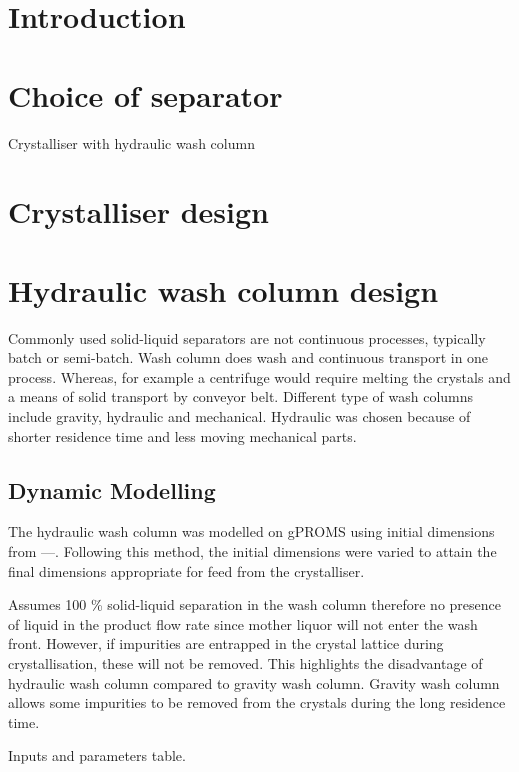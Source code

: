 \section{Introduction}


\section{Choice of separator}
Crystalliser with hydraulic wash column 



\section{Crystalliser design}




\section{Hydraulic wash column design}

Commonly used solid-liquid separators are not continuous processes, typically batch or semi-batch. Wash column does wash and continuous transport in one process. Whereas, for example a centrifuge would require  melting the crystals and a means of solid transport by conveyor belt. Different type of wash columns include gravity, hydraulic and mechanical. Hydraulic was chosen because of shorter residence time and less moving mechanical parts. 

\subsection{Dynamic Modelling}
The hydraulic wash column was modelled on gPROMS using initial dimensions from ---. Following this method, the initial dimensions were varied to attain the final dimensions appropriate for feed from the crystalliser. 

Assumes 100 \% solid-liquid separation in the wash column therefore no presence of liquid in the product flow rate since mother liquor will not enter the wash front. However, if impurities are entrapped in the crystal lattice during crystallisation, these will not be removed. This highlights the disadvantage of hydraulic wash column compared to gravity wash column. Gravity wash column allows some impurities to be removed from the crystals during the long residence time. 

Inputs and parameters table. 

